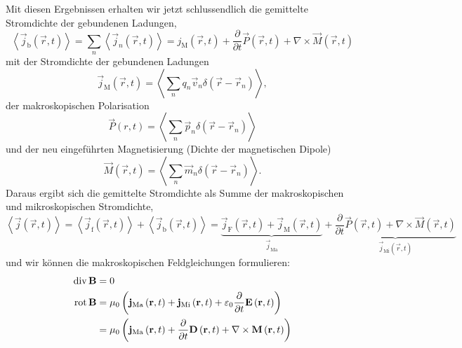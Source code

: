 Mit diesen Ergebnissen erhalten wir jetzt schlussendlich die gemittelte Stromdichte der gebundenen Ladungen,
\begin{equation*}
	\left\langle \vec {j}_{\mathrm{b}}\left(\vec {r},t\right)\right\rangle =\sum _{n}\left\langle \vec {j}_{n}\left(\vec {r},t\right)\right\rangle =j_{\mathrm{M}}\left(\vec {r},t\right)+\frac{\partial }{\partial t}\vec {P}\left(\vec {r},t\right)+\nabla \times \vec {M}\left(\vec {r},t\right)
\end{equation*}
mit der Stromdichte der gebundenen Ladungen
\begin{equation*}
	\vec {j}_{\mathrm{M}}\left(\vec {r},t\right)=\left\langle \sum _{n}q_{n}\vec {v}_{n}\delta \left(\vec {r}-\vec {r}_{n}\right)\right\rangle ,
\end{equation*}
der makroskopischen Polarisation
\begin{equation*}
	\vec {P}\left(r,t\right)=\left\langle \sum _{n}\vec {p}_{n}\delta \left(\vec {r}-\vec {r}_{n}\right)\right\rangle
\end{equation*}
und der neu eingeführten Magnetisierung (Dichte der magnetischen Dipole)
\begin{equation*}
	\vec {M}\left(\vec {r},t\right)=\left\langle \sum _{n}\vec {m}_{n}\delta \left(\vec {r}-\vec {r}_{n}\right)\right\rangle .
\end{equation*}
Daraus ergibt sich die gemittelte Stromdichte als Summe der makroskopischen und mikroskopischen Stromdichte,
\begin{equation*}
	\left\langle \vec {j}\left(\vec {r},t\right)\right\rangle =\left\langle \vec {j}_{\mathrm{f}}\left(\vec {r},t\right)\right\rangle +\left\langle \vec {j}_{\mathrm{b}}\left(\vec {r},t\right)\right\rangle =\underset{\vec {j}_{\mathrm{Ma}}}{\underbrace{\vec {j}_{\mathrm{F}}\left(\vec {r},t\right)+\vec {j}_{\mathrm{M}}\left(\vec {r},t\right)}}+\underset{\vec {j}_{\mathrm{Mi}}\left(\vec {r},t\right)}{\underbrace{\frac{\partial }{\partial t}\vec {P}\left(\vec {r},t\right)+\nabla \times \vec {M}\left(\vec {r},t\right)}}
\end{equation*}
und wir können die makroskopischen Feldgleichungen formulieren:
\begin{align*}
	\operatorname{div} \mathbf{B} & =0                                                                                                                                                                                            \\
	\operatorname{rot} \mathbf{B}  & =\mu _{0}\left(\mathbf{j}_{\mathrm{Ma}}\left(\mathbf{r},t\right)+\mathbf{j}_{\mathrm{Mi}}\left(\mathbf{r},t\right)+\varepsilon _{0}\frac{\partial }{\partial t}\mathbf{E}\left(\mathbf{r},t\right)\right) \\
	               & =\mu _{0}\left(\mathbf{j}_{\mathrm{Ma}}\left(\mathbf{r},t\right)+\frac{\partial }{\partial t}\mathbf{D}\left(\mathbf{r},t\right)+\nabla \times \mathbf{M}\left(\mathbf{r},t\right)\right)
\end{align*}
